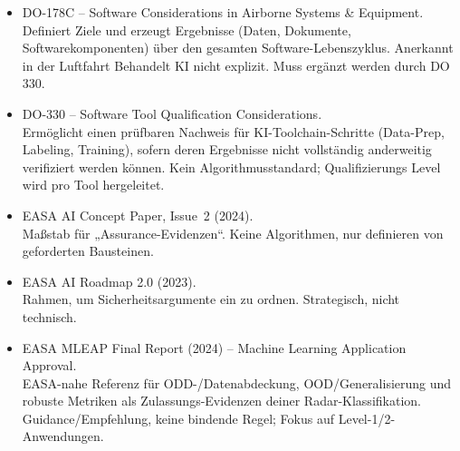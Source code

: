 \begin{itemize}
      
  \item DO-178C – Software Considerations in Airborne Systems \& Equipment.\\
      {Definiert Ziele und erzeugt Ergebnisse (Daten, Dokumente, Softwarekomponenten) über den gesamten Software-Lebenszyklus. Anerkannt in der Luftfahrt}
      {Behandelt KI nicht explizit. Muss ergänzt werden durch DO 330.}

  \item DO-330 – Software Tool Qualification Considerations.\\
      {Ermöglicht einen prüfbaren Nachweis für KI-Toolchain-Schritte (Data-Prep, Labeling, Training), sofern deren Ergebnisse nicht vollständig anderweitig verifiziert werden können.}
      {Kein Algorithmusstandard; Qualifizierungs Level wird pro Tool hergeleitet.}

  \item EASA AI Concept Paper, Issue~2 (2024).\\
      {Maßstab für „Assurance-Evidenzen“.}
      {Keine Algorithmen, nur definieren von geforderten Bausteinen.}

  \item EASA AI Roadmap 2.0 (2023).\\
      {Rahmen, um Sicherheitsargumente ein zu ordnen.}
      {Strategisch, nicht technisch.}


  \item EASA MLEAP Final Report (2024) – Machine Learning Application Approval.\\
      {EASA-nahe Referenz für ODD-/Datenabdeckung, OOD/Generalisierung und robuste Metriken als Zulassungs-Evidenzen deiner Radar-Klassifikation.}
      {Guidance/Empfehlung, keine bindende Regel; Fokus auf Level-1/2-Anwendungen.}
\end{itemize}



